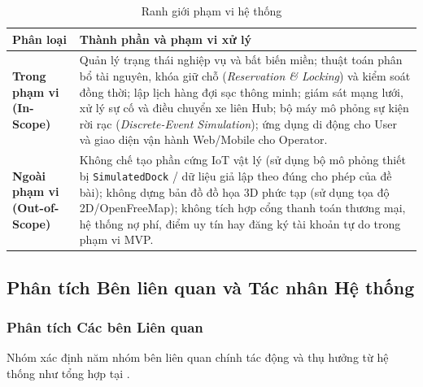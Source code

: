 \begin{table}[H]
\centering
\caption{Ranh giới phạm vi hệ thống}
\label{tab:system-scope}
\begin{tabularx}{\textwidth}{>{\raggedright\arraybackslash}p{3.4cm} >{\raggedright\arraybackslash}X}
\toprule
\textbf{Phân loại} & \textbf{Thành phần và phạm vi xử lý} \\
\midrule
\textbf{Trong phạm vi (In-Scope)} & Quản lý trạng thái nghiệp vụ và bất biến miền; thuật toán phân bổ tài nguyên, khóa giữ chỗ (\textit{Reservation \& Locking}) và kiểm soát đồng thời; lập lịch hàng đợi sạc thông minh; giám sát mạng lưới, xử lý sự cố và điều chuyển xe liên Hub; bộ máy mô phỏng sự kiện rời rạc (\textit{Discrete-Event Simulation}); ứng dụng di động cho User và giao diện vận hành Web/Mobile cho Operator. \\
\addlinespace[4pt]
\textbf{Ngoài phạm vi (Out-of-Scope)} & Không chế tạo phần cứng IoT vật lý (sử dụng bộ mô phỏng thiết bị \texttt{SimulatedDock} / dữ liệu giả lập theo đúng cho phép của đề bài); không dựng bản đồ đồ họa 3D phức tạp (sử dụng tọa độ 2D/OpenFreeMap); không tích hợp cổng thanh toán thương mại, hệ thống nợ phí, điểm uy tín hay đăng ký tài khoản tự do trong phạm vi MVP. \\
\bottomrule
\end{tabularx}
\end{table}

\subsection{Phân tích Bên liên quan và Tác nhân Hệ thống}

\subsubsection*{Phân tích Các bên Liên quan}
Nhóm xác định năm nhóm bên liên quan chính tác động và thụ hưởng từ hệ thống như tổng hợp tại .

